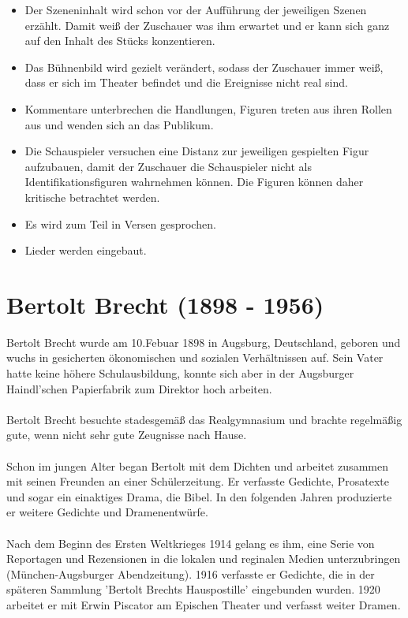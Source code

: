 \documentclass[a4paper]{article}
\begin{document}
        \begin{itemize}
	\item Der Szeneninhalt wird schon vor der Aufführung der jeweiligen Szenen erzählt. Damit weiß der Zuschauer was ihm erwartet und er kann sich ganz auf den Inhalt des Stücks konzentieren.
        \item Das Bühnenbild wird gezielt verändert, sodass der Zuschauer immer weiß, dass er sich im Theater befindet und die Ereignisse nicht real sind.
        \item Kommentare unterbrechen die Handlungen, Figuren treten aus ihren Rollen aus und wenden sich an das Publikum.
        \item Die Schauspieler versuchen eine Distanz zur jeweiligen gespielten Figur aufzubauen, damit der Zuschauer die Schauspieler nicht als Identifikationsfiguren wahrnehmen können. Die Figuren können daher kritische betrachtet werden.
        \item Es wird zum Teil in Versen gesprochen.
        \item Lieder werden eingebaut.
        \end{itemize}
        
        \newpage
        \section{Bertolt Brecht (1898 - 1956)}

	Bertolt Brecht wurde am 10.Febuar 1898 in Augsburg, Deutschland, geboren und wuchs in gesicherten ökonomischen und sozialen Verhältnissen auf. Sein Vater hatte keine höhere Schulausbildung, konnte sich aber in der Augsburger Haindl'schen Papierfabrik zum Direktor hoch arbeiten.\\\\
        Bertolt Brecht besuchte stadesgemäß das Realgymnasium und brachte regelmäßig gute, wenn nicht sehr gute Zeugnisse nach Hause.\\\\
        Schon im jungen Alter began Bertolt mit dem Dichten und arbeitet zusammen mit seinen Freunden an einer Schülerzeitung. Er verfasste Gedichte, Prosatexte und sogar ein einaktiges Drama, die Bibel. In den folgenden Jahren produzierte er weitere Gedichte und Dramenentwürfe.\\\\
        Nach dem Beginn des Ersten Weltkrieges 1914 gelang es ihm, eine Serie von Reportagen und Rezensionen in die lokalen und reginalen Medien unterzubringen (München-Augsburger Abendzeitung). 1916 verfasste er Gedichte, die in der späteren Sammlung 'Bertolt Brechts Hauspostille' eingebunden wurden. 1920 arbeitet er mit Erwin Piscator am Epischen Theater und verfasst weiter Dramen.\\\\
\end{document}
